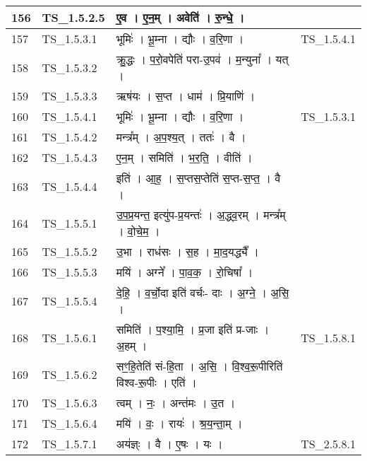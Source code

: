 \documentclass[17pt]{extarticle}
\begin{document}
\begin{longtable}{||p{0.4in}||p{0.9in}||p{4.0in}||p{0.9in}||}
            156 & TS\_1.5.2.5 & ए॒व   ।   ए॒न॒म्   ।   अवेति॑   ।   रु॒न्धे॒   ।    &      \\
        \hline
            157 & TS\_1.5.3.1 & भूमिः॑   ।   भू॒म्ना   ।   द्यौः   ।   व॒रि॒णा   ।    &  TS\_1.5.4.1       \\
        \hline
            158 & TS\_1.5.3.2 & क्रु॒द्धः   ।   प॒रो॒वपेति॑ परा{-}उ॒पव॑   ।   म॒न्युना᳚   ।   यत्   ।    &      \\
        \hline
            159 & TS\_1.5.3.3 & ऋष॑यः   ।   स॒प्त   ।   धाम॑   ।   प्रि॒याणि॑   ।    &      \\
        \hline
            160 & TS\_1.5.4.1 & भूमिः॑   ।   भू॒म्ना   ।   द्यौः   ।   व॒रि॒णा   ।    & TS\_1.5.3.1        \\
        \hline
            161 & TS\_1.5.4.2 & मन्त्र᳚म्   ।   अ॒प॒श्य॒त्   ।   ततः॑   ।   वै   ।    &      \\
        \hline
            162 & TS\_1.5.4.3 & ए॒न॒म्   ।   समिति॑   ।   भ॒र॒ति॒   ।   वीति॑   ।    &      \\
        \hline
            163 & TS\_1.5.4.4 & इति॑   ।   आ॒ह॒   ।   स॒प्तस॒प्तेति॑ स॒प्त{-}स॒प्त॒   ।   वै   ।    &      \\
        \hline
            164 & TS\_1.5.5.1 & उ॒प॒प्र॒यन्त॒ इत्यु॑प{-}प्र॒यन्तः॑   ।   अ॒द्ध्व॒रम्   ।   मन्त्र᳚म्   ।   वो॒चे॒म॒   ।    &      \\
        \hline
            165 & TS\_1.5.5.2 & उ॒भा   ।   राध॑सः   ।   स॒ह   ।   मा॒द॒यद्ध्यै᳚   ।    &      \\
        \hline
            166 & TS\_1.5.5.3 & मयि॑   ।   अग्ने᳚   ।   पा॒व॒क॒   ।   रो॒चिषा᳚   ।    &      \\
        \hline
            167 & TS\_1.5.5.4 & दे॒हि॒   ।   व॒र्चो॒दा इति॑ वर्चः{-} दाः   ।   अ॒ग्ने॒   ।   अ॒सि॒   ।    &      \\
        \hline
            168 & TS\_1.5.6.1 & समिति॑   ।   प॒श्या॒मि॒   ।   प्र॒जा इति॑ प्र{-}जाः   ।   अ॒हम्   ।    &  TS\_1.5.8.1       \\
        \hline
            169 & TS\_1.5.6.2 & सꣳ॒॒हि॒तेति॑ सं{-}हि॒ता   ।   अ॒सि॒   ।   वि॒श्व॒रू॒पीरिति॑ विश्व{-}रू॒पीः   ।   एति॑   ।    &      \\
        \hline
            170 & TS\_1.5.6.3 & त्वम्   ।   नः॒   ।   अन्त॑मः   ।   उ॒त   ।    &      \\
        \hline
            171 & TS\_1.5.6.4 & मयि॑   ।   वः॒   ।   रायः॑   ।   श्र॒य॒न्ता॒म्   ।    &      \\
        \hline
            172 & TS\_1.5.7.1 & अय॑ज्ञ्ः   ।   वै   ।   ए॒षः   ।   यः   ।    &  TS\_2.5.8.1       \\

\end{longtable}
\end{document}
